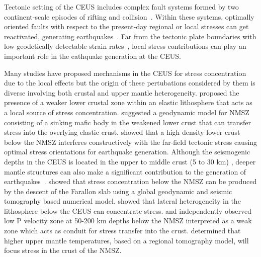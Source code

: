 \documentclass[draft,linenumbers]{agujournal2018}
\begin{document}
    Tectonic setting of the CEUS includes complex fault systems formed by two continent-scale episodes of rifting and collision~\citep[e.g.,][]{keller1983role, hoffman1989precambrian, thomas2006tectonic}. Within these systems, optimally oriented faults with respect to the present-day regional or local stresses can get reactivated, generating earthquakes~\citep[e.g.,][]{zoback1992stress, hurd2012intraplate}. Far from the tectonic plate boundaries with low geodetically detectable strain rates~\citep{Boyd_2015}, local stress contributions can play an important role in the eathquake generation at the CEUS. 
    
    Many studies have proposed mechanisms in the CEUS for stress concentration due to the local effects but the origin of these pertubations considered by them is diverse involving both crustal and upper mantle heterogeneity. \citet{Kenner_2000a} proposed the presence of a weaker lower crustal zone within an elastic lithosphere that acts as a local source of stress concentration. \citet{Pollitz_2001} suggested a geodynamic model for NMSZ consisting of a sinking mafic body in the weakened lower crust that can transfer stress into the overlying elastic crust. \citet{levandowski2016dense} showed that a high density lower crust below the NMSZ interferes constructively with the far-field tectonic stress causing optimal stress orientations for earthquake generation.  Although the seismogenic depths in the CEUS is located in the upper to middle crust (5 to 30 km) \citep{vlahovic1998et1d, johnston1996seismic, mazzotti2010state}, deeper mantle structures can also make a significant contribution to the generation of  earthquakes~\citep[e.g.,][]{forte2007descent, li2007stress, chen2014crust, nyamwandha2016joint, zhan2016stress}. \citet{forte2007descent} showed that stress concentration below the NMSZ can be produced by the descent of the Farallon slab using a global geodynamic and seismic tomography based numerical model. \citet{li2007stress} showed that lateral heterogeneity in the lithosphere below the CEUS can concentrate stress. \citet{chen2014crust} and \citet{nyamwandha2016joint} independently observed low P velocity zone at 50-200 km depths below the NMSZ interpreted as a weak zone which acts as conduit for stress transfer into the crust. \citet{zhan2016stress} determined that higher upper mantle temperatures, based on a regional tomography \citep{pollitz2014seismic}model, will focus stress in the crust of the NMSZ.
    
\end{document}
